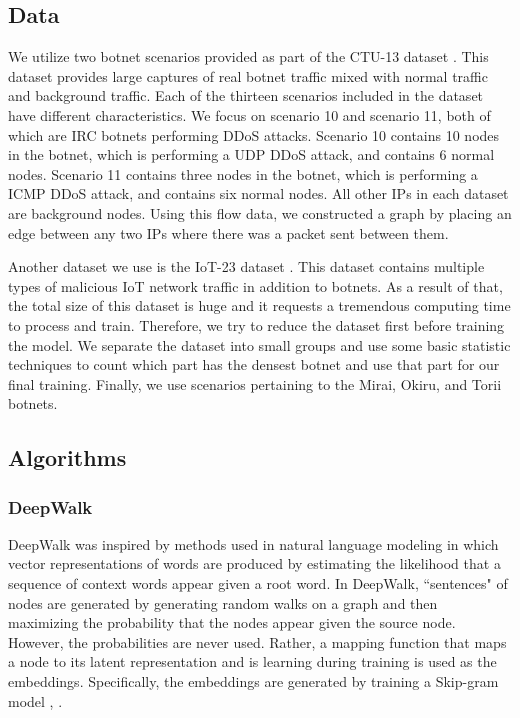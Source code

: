 \documentclass[10pt]{article}
\begin{document}
\begin{multicols}{2}
\subsection{Data}
We utilize two botnet scenarios provided as part of the CTU-13 dataset \cite{Garcia}. This dataset provides large captures of real botnet traffic mixed with normal traffic and background traffic. Each of the thirteen scenarios included in the dataset have different characteristics. We focus on scenario 10 and scenario 11, both of which are IRC botnets performing DDoS attacks. Scenario 10 contains 10 nodes in the botnet, which is performing a UDP DDoS attack, and contains 6 normal nodes. Scenario 11 contains three nodes in the botnet, which is performing a ICMP DDoS attack, and contains six normal nodes. All other IPs in each dataset are background nodes. Using this flow data, we constructed a graph by placing an edge between any two IPs where there was a packet sent between them. 

Another dataset we use is the IoT-23 dataset \cite{IoT-23}. This dataset contains multiple types of malicious IoT network traffic in addition to botnets. As a result of that, the total size of this dataset is huge and it requests a tremendous computing time to process and train. Therefore, we try to reduce the dataset first before training the model. We separate the dataset into small groups and use some basic statistic techniques to count which part has the densest botnet and use that part for our final training. Finally, we use scenarios pertaining to the Mirai, Okiru, and Torii botnets. 

\subsection{Algorithms}
 \subsubsection{DeepWalk}
DeepWalk \cite{Perozzi} was inspired by methods used in natural language modeling in which vector representations of words are produced by estimating the likelihood that a sequence of context words appear given a root word. In DeepWalk, ``sentences" of nodes are generated by generating random walks on a graph and then maximizing the probability that the nodes appear given the source node. However, the probabilities are never used. Rather, a mapping function that maps a node to its latent representation and is learning during training is used as the embeddings. Specifically, the embeddings are generated by training a Skip-gram model \cite{Mikolov}, \cite{Perozzi}.


\end{multicols}
\end{document}
